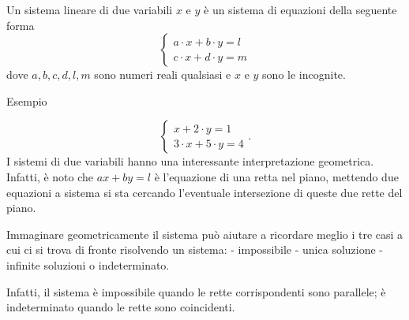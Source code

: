 \documentclass{article}
\begin{document}
Un sistema lineare di due variabili $x$ e $y$ è un sistema di equazioni della seguente forma 
$$
\begin{cases}
    a\cdot x + b \cdot y = l\\
    c \cdot x + d \cdot y = m
\end{cases}
$$
dove $a,b,c,d, l,m$ sono numeri reali qualsiasi e $x$ e $y$ sono le incognite. 

Esempio

$$
\begin{cases}
     x + 2 \cdot y = 1\\
    3 \cdot x + 5 \cdot y = 4
\end{cases}.
$$
I sistemi di due variabili hanno una interessante interpretazione geometrica. Infatti, è noto che $ax + by = l$ è l'equazione di una retta nel piano, mettendo due equazioni a sistema si sta cercando l'eventuale intersezione di queste due rette del piano.  

\begin{center}
\end{center}

Immaginare geometricamente il sistema può aiutare a ricordare meglio i tre casi a cui ci si trova di fronte risolvendo un sistema:
- impossibile 
- unica soluzione
- infinite soluzioni o indeterminato.

Infatti, il sistema è impossibile quando le rette corrispondenti sono parallele; è indeterminato quando le rette sono coincidenti.

\begin{center}
    
\end{center}
\end{document}
